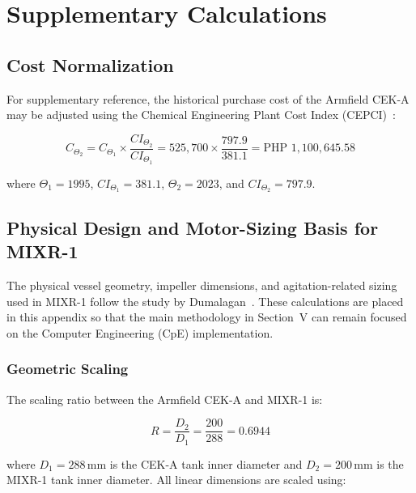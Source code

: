 \chapter{Supplementary Calculations}
\label{app:calculations}

\section{Cost Normalization}

For supplementary reference, the historical purchase cost of the Armfield CEK-A may be adjusted using the Chemical Engineering Plant Cost Index (CEPCI)~\cite{towler2013}:

\begin{equation}
C_{\Theta_2} = C_{\Theta_1} \times \frac{CI_{\Theta_2}}{CI_{\Theta_1}} = 525{,}700 \times \frac{797.9}{381.1} = \text{PHP } 1{,}100{,}645.58
\label{eq:inflation}
\end{equation}

where $\Theta_1 = 1995$, $CI_{\Theta_1} = 381.1$, $\Theta_2 = 2023$, and $CI_{\Theta_2} = 797.9$.

\section{Physical Design and Motor-Sizing Basis for MIXR-1}

The physical vessel geometry, impeller dimensions, and agitation-related sizing used in MIXR-1 follow the study by Dumalagan~\cite{dumalagan2024}. These calculations are placed in this appendix so that the main methodology in Section~V can remain focused on the Computer Engineering (CpE) implementation.

\subsection{Geometric Scaling}

The scaling ratio between the Armfield CEK-A and MIXR-1 is:

\begin{equation}
R = \frac{D_2}{D_1} = \frac{200}{288} = 0.6944
\label{eq:scaling_ratio}
\end{equation}

\noindent where $D_1 = 288$\,mm is the CEK-A tank inner diameter and $D_2 = 200$\,mm is the MIXR-1 tank inner diameter. All linear dimensions are scaled using:


